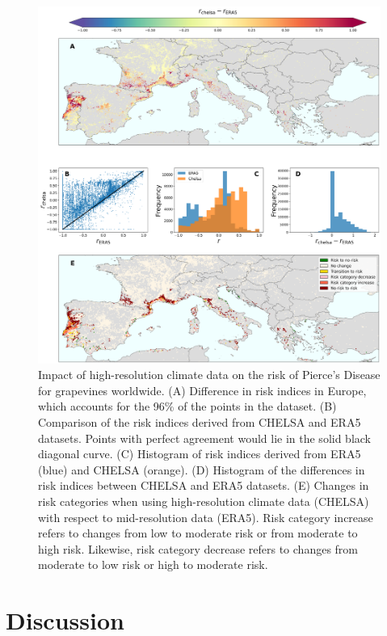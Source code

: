 \begin{figure}[H]
    \centering

    \includegraphics[width=\textwidth]{Figures/risk_difference_vineyards.pdf}
    \caption{Impact of high-resolution climate data on the risk of Pierce's
        Disease for grapevines worldwide. (A) Difference in risk indices in
        Europe,
        which accounts for the 96\% of the points in the dataset. (B)
        Comparison of the
        risk indices derived from CHELSA and ERA5 datasets. Points with perfect
        agreement would lie in the solid black diagonal curve. (C) Histogram of
        risk
        indices derived from ERA5 (blue) and CHELSA (orange). (D) Histogram of
        the
        differences in risk indices between CHELSA and ERA5 datasets. (E)
        Changes in
        risk categories when using high-resolution climate data (CHELSA) with
        respect
        to mid-resolution data (ERA5). Risk category increase refers to changes
        from
        low to moderate risk or from moderate to high risk. Likewise, risk
        category
        decrease refers to changes from moderate to low risk or high to
        moderate risk.}
    \label{fig:risk_dif_vid}
\end{figure}

\section{Discussion}

